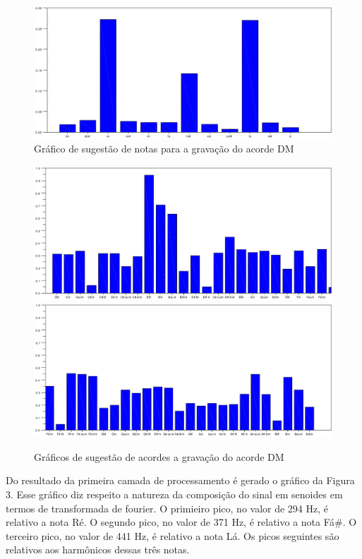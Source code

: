 \begin{figure}[h]
	\centering
		\includegraphics[keepaspectratio=true,scale=0.49]{figuras/Dm/notas_DM.eps}
	\caption{Gráfico de sugestão de notas para a gravação do acorde DM}
\end{figure}

\begin{figure}[h]
	\centering
		\includegraphics[keepaspectratio=true,scale=0.45]{figuras/Dm/acordes_1_DM.eps}
		\includegraphics[keepaspectratio=true,scale=0.45]{figuras/Dm/acordes_2_DM.eps}
	\caption{Gráficos de sugestão de acordes a gravação do acorde DM}
\end{figure}
\newpage
Do resultado da primeira camada de processamento é gerado o gráfico da Figura 3. Esse gráfico diz respeito a natureza da composição do sinal em senoides em termos de transformada de fourier. O primieiro pico, no valor de 294 Hz, é relativo a nota Ré. O segundo pico, no valor de 371 Hz, é relativo a nota Fá\#. O terceiro pico, no valor de 441 Hz, é relativo a nota Lá. Os picos seguintes são relativos aos harmônicos dessas três notas. 

